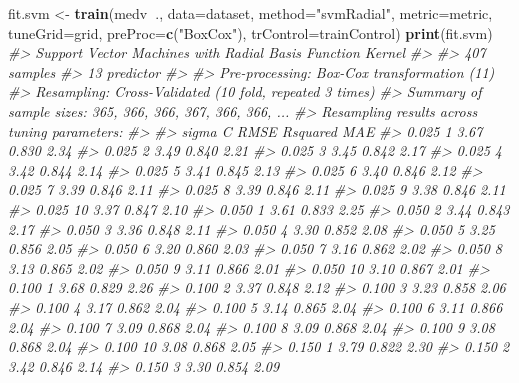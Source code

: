 \documentclass[]{book}
\newenvironment{Shaded}{\begin{snugshade}}{\end{snugshade}}
\newcommand{\CommentTok}[1]{\textcolor[rgb]{0.56,0.35,0.01}{\textit{#1}}}
\newcommand{\DataTypeTok}[1]{\textcolor[rgb]{0.13,0.29,0.53}{#1}}
\newcommand{\KeywordTok}[1]{\textcolor[rgb]{0.13,0.29,0.53}{\textbf{#1}}}
\newcommand{\NormalTok}[1]{#1}
\newcommand{\OperatorTok}[1]{\textcolor[rgb]{0.81,0.36,0.00}{\textbf{#1}}}
\newcommand{\StringTok}[1]{\textcolor[rgb]{0.31,0.60,0.02}{#1}}
\begin{document}
\begin{Shaded}
\begin{Highlighting}[]
\NormalTok{fit.svm <-}\StringTok{ }\KeywordTok{train}\NormalTok{(medv}\OperatorTok{~}\NormalTok{., }\DataTypeTok{data=}\NormalTok{dataset, }\DataTypeTok{method=}\StringTok{"svmRadial"}\NormalTok{, }\DataTypeTok{metric=}\NormalTok{metric, }
                 \DataTypeTok{tuneGrid=}\NormalTok{grid, }
                 \DataTypeTok{preProc=}\KeywordTok{c}\NormalTok{(}\StringTok{"BoxCox"}\NormalTok{), }\DataTypeTok{trControl=}\NormalTok{trainControl)}
\KeywordTok{print}\NormalTok{(fit.svm)}
\CommentTok{#> Support Vector Machines with Radial Basis Function Kernel }
\CommentTok{#> }
\CommentTok{#> 407 samples}
\CommentTok{#>  13 predictor}
\CommentTok{#> }
\CommentTok{#> Pre-processing: Box-Cox transformation (11) }
\CommentTok{#> Resampling: Cross-Validated (10 fold, repeated 3 times) }
\CommentTok{#> Summary of sample sizes: 365, 366, 366, 367, 366, 366, ... }
\CommentTok{#> Resampling results across tuning parameters:}
\CommentTok{#> }
\CommentTok{#>   sigma  C   RMSE  Rsquared  MAE }
\CommentTok{#>   0.025   1  3.67  0.830     2.34}
\CommentTok{#>   0.025   2  3.49  0.840     2.21}
\CommentTok{#>   0.025   3  3.45  0.842     2.17}
\CommentTok{#>   0.025   4  3.42  0.844     2.14}
\CommentTok{#>   0.025   5  3.41  0.845     2.13}
\CommentTok{#>   0.025   6  3.40  0.846     2.12}
\CommentTok{#>   0.025   7  3.39  0.846     2.11}
\CommentTok{#>   0.025   8  3.39  0.846     2.11}
\CommentTok{#>   0.025   9  3.38  0.846     2.11}
\CommentTok{#>   0.025  10  3.37  0.847     2.10}
\CommentTok{#>   0.050   1  3.61  0.833     2.25}
\CommentTok{#>   0.050   2  3.44  0.843     2.17}
\CommentTok{#>   0.050   3  3.36  0.848     2.11}
\CommentTok{#>   0.050   4  3.30  0.852     2.08}
\CommentTok{#>   0.050   5  3.25  0.856     2.05}
\CommentTok{#>   0.050   6  3.20  0.860     2.03}
\CommentTok{#>   0.050   7  3.16  0.862     2.02}
\CommentTok{#>   0.050   8  3.13  0.865     2.02}
\CommentTok{#>   0.050   9  3.11  0.866     2.01}
\CommentTok{#>   0.050  10  3.10  0.867     2.01}
\CommentTok{#>   0.100   1  3.68  0.829     2.26}
\CommentTok{#>   0.100   2  3.37  0.848     2.12}
\CommentTok{#>   0.100   3  3.23  0.858     2.06}
\CommentTok{#>   0.100   4  3.17  0.862     2.04}
\CommentTok{#>   0.100   5  3.14  0.865     2.04}
\CommentTok{#>   0.100   6  3.11  0.866     2.04}
\CommentTok{#>   0.100   7  3.09  0.868     2.04}
\CommentTok{#>   0.100   8  3.09  0.868     2.04}
\CommentTok{#>   0.100   9  3.08  0.868     2.04}
\CommentTok{#>   0.100  10  3.08  0.868     2.05}
\CommentTok{#>   0.150   1  3.79  0.822     2.30}
\CommentTok{#>   0.150   2  3.42  0.846     2.14}
\CommentTok{#>   0.150   3  3.30  0.854     2.09}

\end{Highlighting}
\end{Shaded}
\end{document}
